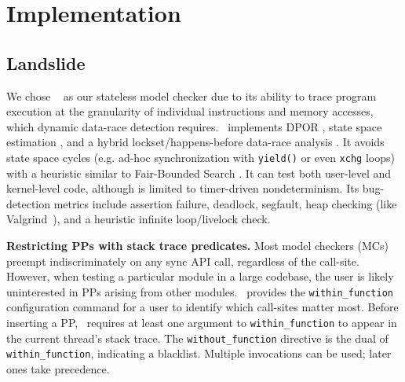 \section{Implementation}
\label{sec:implementation}

\subsection{Landslide}
\label{sec:landslide}

We chose \landslide~\cite{landslide} as our stateless model checker due to its ability to trace program execution at the granularity of individual instructions and memory accesses, which dynamic data-race detection requires.
\landslide~implements DPOR \cite{dpor},
state space estimation \cite{estimation}, and a hybrid lockset/happens-before data-race analysis \cite{hybriddatarace}.
It avoids state space cycles (e.g. ad-hoc synchronization with {\tt yield()} or even {\tt xchg} loops) with a heuristic similar to Fair-Bounded Search \cite{bpor}.
It can test both user-level and kernel-level code, although is limited to timer-driven nondeterminism.
Its bug-detection metrics include assertion failure, deadlock, segfault, heap checking (like Valgrind~\cite{valgrind}), and a heuristic infinite loop/livelock check.

{\bf Restricting PPs with stack trace predicates.}
Most model checkers (MCs) preempt indiscriminately on any sync API call, regardless of the call-site.
However, when testing a particular module in a large codebase,
the user is likely uninterested in PPs arising from other modules.
\landslide~provides the {\tt within\_function} configuration command for a user to identify which call-sites matter most.
Before inserting a PP, \landslide~requires at least one argument to {\tt within\_function} to appear in the current thread's stack trace.
The {\tt without\_function} directive is the dual of {\tt within\_function}, indicating a blacklist.
Multiple invocations can be used; later ones take precedence.

